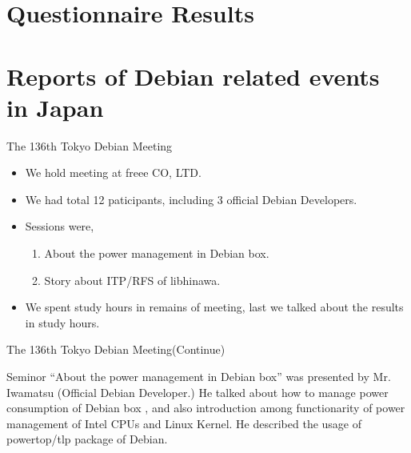 \section{Questionnaire Results}
{\footnotesize
 
}

\section{Reports of Debian related events in Japan}

\begin{frame}{The 136th Tokyo Debian Meeting}

\begin{itemize}
\item We hold meeting at freee CO, LTD.
\item We had total 12 paticipants, including 3 official Debian Developers.
\item Sessions were,
  \begin{enumerate}
  \item About the power management in Debian box.
  \item Story about ITP/RFS of libhinawa.
  \end{enumerate}

\item We spent study hours in remains of meeting, last we talked about the results in study hours.
\end{itemize} 
\end{frame}

\begin{frame}{The 136th Tokyo Debian Meeting(Continue)}

  Seminor ``About the power management in Debian box'' was presented by Mr. Iwamatsu (Official Debian Developer.) He talked about how to manage power consumption of Debian box , and also introduction among functionarity of power management of Intel CPUs and Linux Kernel. He described the usage of powertop/tlp package of Debian.
  
\end{frame}

